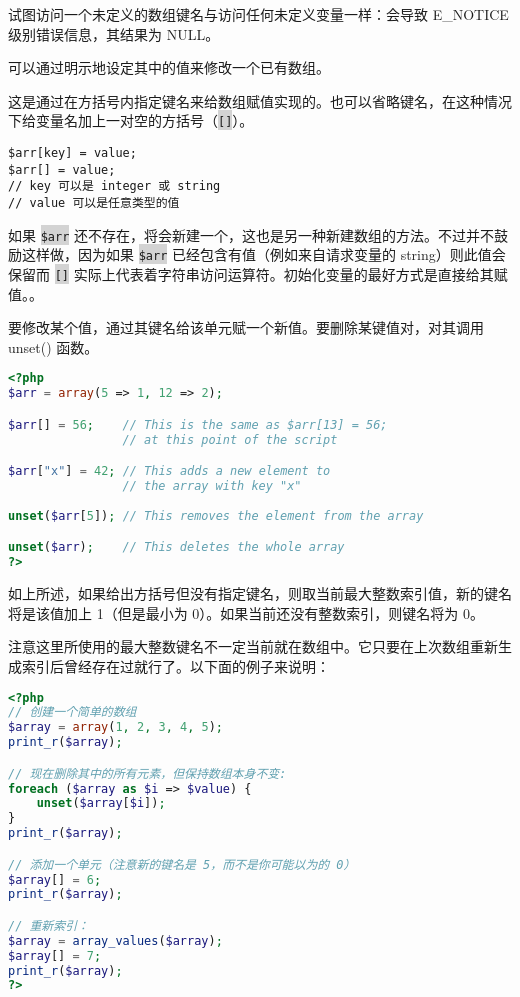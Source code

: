 试图访问一个未定义的数组键名与访问任何未定义变量一样：会导致 E\_NOTICE 级别错误信息，其结果为 NULL。

可以通过明示地设定其中的值来修改一个已有数组。

这是通过在方括号内指定键名来给数组赋值实现的。也可以省略键名，在这种情况下给变量名加上一对空的方括号（\colorbox{lightgray}{\texttt{[]}}）。

\begin{verbatim}
$arr[key] = value;
$arr[] = value;
// key 可以是 integer 或 string
// value 可以是任意类型的值
\end{verbatim}

如果 \colorbox{lightgray}{\texttt{\$arr}} 还不存在，将会新建一个，这也是另一种新建数组的方法。不过并不鼓励这样做，因为如果 \colorbox{lightgray}{\texttt{\$arr}} 已经包含有值（例如来自请求变量的 string）则此值会保留而 \colorbox{lightgray}{\texttt{[]}} 实际上代表着字符串访问运算符。初始化变量的最好方式是直接给其赋值。。

要修改某个值，通过其键名给该单元赋一个新值。要删除某键值对，对其调用 unset() 函数。


\begin{lstlisting}[language=PHP]
<?php
$arr = array(5 => 1, 12 => 2);

$arr[] = 56;    // This is the same as $arr[13] = 56;
                // at this point of the script

$arr["x"] = 42; // This adds a new element to
                // the array with key "x"
                
unset($arr[5]); // This removes the element from the array

unset($arr);    // This deletes the whole array
?>
\end{lstlisting}

如上所述，如果给出方括号但没有指定键名，则取当前最大整数索引值，新的键名将是该值加上 1（但是最小为 0）。如果当前还没有整数索引，则键名将为 0。

注意这里所使用的最大整数键名不一定当前就在数组中。它只要在上次数组重新生成索引后曾经存在过就行了。以下面的例子来说明：

\begin{lstlisting}[language=PHP]
<?php
// 创建一个简单的数组
$array = array(1, 2, 3, 4, 5);
print_r($array);

// 现在删除其中的所有元素，但保持数组本身不变:
foreach ($array as $i => $value) {
    unset($array[$i]);
}
print_r($array);

// 添加一个单元（注意新的键名是 5，而不是你可能以为的 0）
$array[] = 6;
print_r($array);

// 重新索引：
$array = array_values($array);
$array[] = 7;
print_r($array);
?>
\end{lstlisting}

